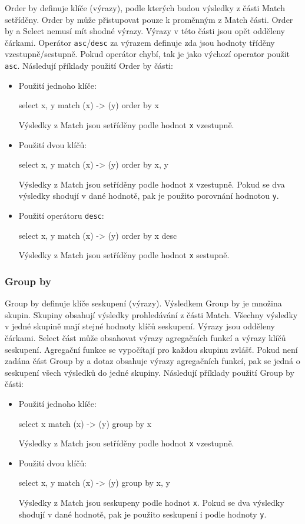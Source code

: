 Order by definuje klíče (výrazy), podle kterých budou výsledky z části Match setříděny.
Order by může přistupovat pouze k proměnným z Match části.
Order by a Select nemusí mít shodné výrazy.
Výrazy v této části jsou opět odděleny čárkami.
Operátor \texttt{asc}/\texttt{desc} za výrazem definuje zda jsou hodnoty tříděny vzestupně/sestupně.
Pokud operátor chybí, tak je jako výchozí operator použit \texttt{asc}.
Následují příklady použití Order by části:
\begin{itemize}
\item
Použití jednoho klíče:
\begin{code}
select x, y match (x) -> (y) order by x
\end{code}
Výsledky z Match jsou setříděny podle hodnot \texttt{x} vzestupně.

\item
Použití dvou klíčů:
\begin{code}
select x, y match (x) -> (y) order by x, y
\end{code}
Výsledky z Match jsou setříděny podle hodnot \texttt{x} vzestupně.
Pokud se dva výsledky shodují v dané hodnotě, pak je použito porovnání hodnotou \texttt{y}.

\item
Použití operátoru \texttt{desc}:
\begin{code}
select x, y match (x) -> (y) order by x desc
\end{code}
Výsledky z Match jsou setříděny podle hodnot \texttt{x} sestupně.
\end{itemize}

\subsubsection{Group by}

Group by definuje klíče seskupení (výrazy).
Výsledkem Group by je množina skupin.
Skupiny obsahují výsledky prohledávání z části Match.
Všechny výsledky v jedné skupině mají stejné hodnoty klíčů seskupení. 
Výrazy jsou odděleny čárkami.
Select část může obsahovat výrazy agregačních funkcí a výrazy klíčů seskupení.
Agregační funkce se vypočítají pro každou skupinu zvlášť.
Pokud není zadána část Group by a dotaz obsahuje výrazy agregačních funkcí, pak se jedná o seskupení všech výsledků do jedné skupiny.
Následují příklady použití Group by části:
\begin{itemize}
\item
Použití jednoho klíče:
\begin{code}
select x match (x) -> (y) group by x
\end{code}
Výsledky z Match jsou setříděny podle hodnot \texttt{x} vzestupně.

\item
Použití dvou klíčů:
\begin{code}
select x, y match (x) -> (y) group by x, y
\end{code}
Výsledky z Match jsou seskupeny podle hodnot \texttt{x}.
Pokud se dva výsledky shodují v dané hodnotě, pak je použito seskupení i podle hodnoty \texttt{y}.
\end{itemize}